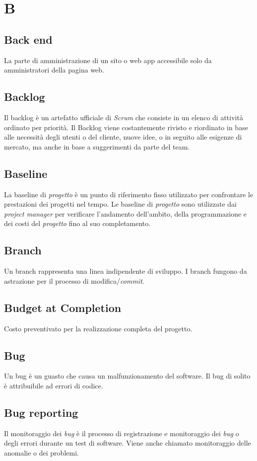 \chapter{B}
\section{Back end}\label{sec:Back-end}
La parte di amministrazione di un sito o web app accessibile solo da amministratori della pagina web.

\section{Backlog}
Il backlog è un artefatto ufficiale di \emph{Scrum} che consiste in un elenco di attività ordinato per priorità. Il Backlog viene costantemente rivisto e riordinato in base alle necessità degli utenti o del cliente, nuove idee, o in seguito alle esigenze di mercato, ma anche in base a suggerimenti da parte del team.

\section{Baseline}
La baseline di \emph{progetto} è un punto di riferimento fisso utilizzato per confrontare le prestazioni dei progetti nel tempo. Le baseline di \emph{progetto} sono utilizzate dai \emph{project manager} per verificare l'andamento dell'ambito, della programmazione e dei costi del \emph{progetto} fino al suo completamento.

\section{Branch}
Un branch rappresenta una linea indipendente di sviluppo. I branch fungono da astrazione per il processo di modifica/\emph{commit}.

\section{Budget at Completion}
Costo preventivato per la realizzazione completa del progetto.

\section{Bug}\label{sec:Bugs}
Un bug è un guasto che causa un malfunzionamento del software. Il bug di solito è attribuibile ad errori di codice.

\section{Bug reporting}
Il monitoraggio dei \emph{bug} è il processo di registrazione e monitoraggio dei \emph{bug} o degli errori durante un test di software. Viene anche chiamato monitoraggio delle anomalie o dei problemi.
